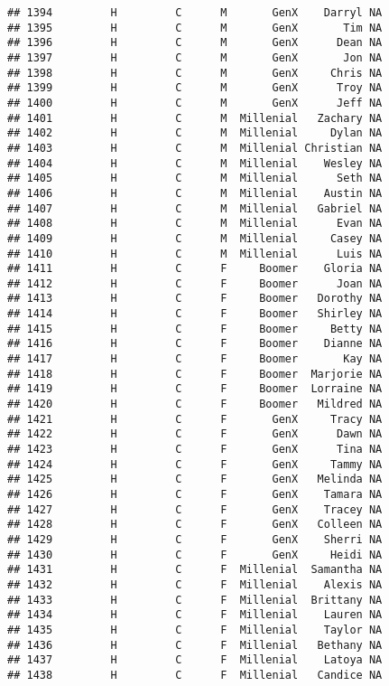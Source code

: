 \documentclass[
]{article}
\begin{document}
\begin{verbatim}
## 1394         H         C      M       GenX    Darryl NA
## 1395         H         C      M       GenX       Tim NA
## 1396         H         C      M       GenX      Dean NA
## 1397         H         C      M       GenX       Jon NA
## 1398         H         C      M       GenX     Chris NA
## 1399         H         C      M       GenX      Troy NA
## 1400         H         C      M       GenX      Jeff NA
## 1401         H         C      M  Millenial   Zachary NA
## 1402         H         C      M  Millenial     Dylan NA
## 1403         H         C      M  Millenial Christian NA
## 1404         H         C      M  Millenial    Wesley NA
## 1405         H         C      M  Millenial      Seth NA
## 1406         H         C      M  Millenial    Austin NA
## 1407         H         C      M  Millenial   Gabriel NA
## 1408         H         C      M  Millenial      Evan NA
## 1409         H         C      M  Millenial     Casey NA
## 1410         H         C      M  Millenial      Luis NA
## 1411         H         C      F     Boomer    Gloria NA
## 1412         H         C      F     Boomer      Joan NA
## 1413         H         C      F     Boomer   Dorothy NA
## 1414         H         C      F     Boomer   Shirley NA
## 1415         H         C      F     Boomer     Betty NA
## 1416         H         C      F     Boomer    Dianne NA
## 1417         H         C      F     Boomer       Kay NA
## 1418         H         C      F     Boomer  Marjorie NA
## 1419         H         C      F     Boomer  Lorraine NA
## 1420         H         C      F     Boomer   Mildred NA
## 1421         H         C      F       GenX     Tracy NA
## 1422         H         C      F       GenX      Dawn NA
## 1423         H         C      F       GenX      Tina NA
## 1424         H         C      F       GenX     Tammy NA
## 1425         H         C      F       GenX   Melinda NA
## 1426         H         C      F       GenX    Tamara NA
## 1427         H         C      F       GenX    Tracey NA
## 1428         H         C      F       GenX   Colleen NA
## 1429         H         C      F       GenX    Sherri NA
## 1430         H         C      F       GenX     Heidi NA
## 1431         H         C      F  Millenial  Samantha NA
## 1432         H         C      F  Millenial    Alexis NA
## 1433         H         C      F  Millenial  Brittany NA
## 1434         H         C      F  Millenial    Lauren NA
## 1435         H         C      F  Millenial    Taylor NA
## 1436         H         C      F  Millenial   Bethany NA
## 1437         H         C      F  Millenial    Latoya NA
## 1438         H         C      F  Millenial   Candice NA

\end{verbatim}
\end{document}
